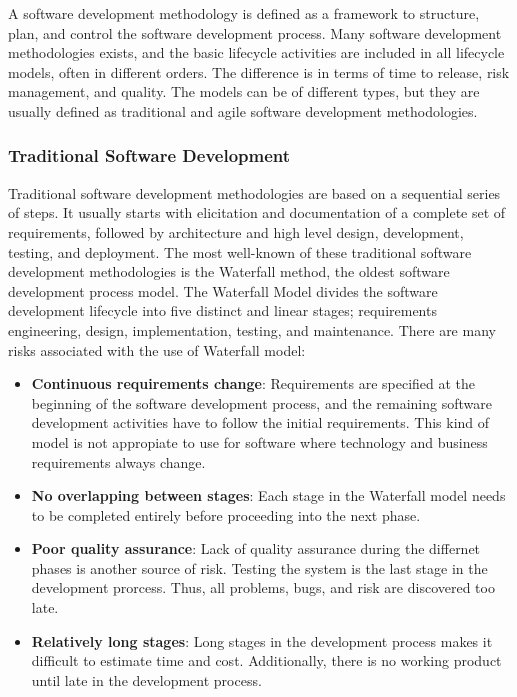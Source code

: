 A software development methodology is defined as a framework to structure, plan, and control the software development process. Many software development methodologies exists, and the basic lifecycle activities are included in all lifecycle models, often in different orders. The difference is in terms of time to release, risk management, and quality. The models can be of different types, but they are usually defined as traditional and agile software development methodologies.

\subsubsection{Traditional Software Development}
Traditional software development methodologies are based on a sequential series of steps. It usually starts with elicitation and documentation of a complete set of requirements, followed by architecture and high level design, development, testing, and deployment. The most well-known of these traditional software development methodologies is the Waterfall method, the oldest software development process model. The Waterfall Model divides the software development lifecycle into five distinct and linear stages\cite{Vliet:2008:SEP:1481475}; requirements engineering, design, implementation, testing, and maintenance. There are many risks associated with the use of Waterfall model\cite{hijazi2012review}:
\begin{itemize}
	\item \textbf{Continuous requirements change}: Requirements are specified at the beginning of the software development process, and the remaining software development activities have to follow the initial requirements. This kind of model is not appropiate to use for software where technology and business requirements always change. 
	\item \textbf{No overlapping between stages}: Each stage in the Waterfall model needs to be completed entirely before proceeding into the next phase.
	\item \textbf{Poor quality assurance}: Lack of quality assurance during the differnet phases is another source of risk. Testing the system is the last stage in the development prorcess. Thus, all problems, bugs, and risk are discovered too late.
	\item \textbf{Relatively long stages}: Long stages in the development process makes it difficult to estimate time and cost. Additionally, there is no working product until late in the development process. 
\end{itemize}

